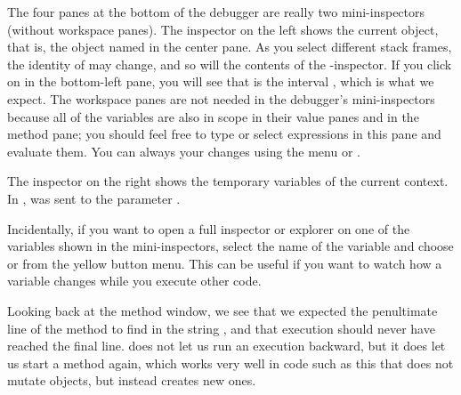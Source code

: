 \documentclass[a4paper,10pt,twoside]{book}
\begin{document}
The four panes at the bottom of the debugger are really two mini-inspectors (without workspace panes).
The inspector on the left shows the current object, that is, the object named \self in the center pane.
As you select different stack frames, the identity of \self may change, and so will the contents of the \self{}-inspector.
If you click on \self in the bottom-left pane, you will see that \self is the interval , which is what we expect.
The workspace panes are not needed in the debugger's mini-inspectors because all of the variables are also in scope in their value panes and in the method pane; you should feel free to type or select expressions in this pane and evaluate them.
You can always  your changes using the menu or .

The inspector on the right shows the temporary variables of the current context.
In ,  was sent to the parameter .


Incidentally, if you want to open a full inspector or explorer on one of the variables shown in the mini-inspectors, select the name of the variable and choose  or  from the yellow button menu.
This can be useful if you want to watch how a variable changes while you execute other code.

Looking back at the method window, we see that we expected the penultimate line of the method to find  in the string , and that execution should never have reached the final line.
\sq does not let us run an execution backward, but it does let us start a method again, which works very well in code such as this that does not mutate objects, but instead creates new ones.

\end{document}
